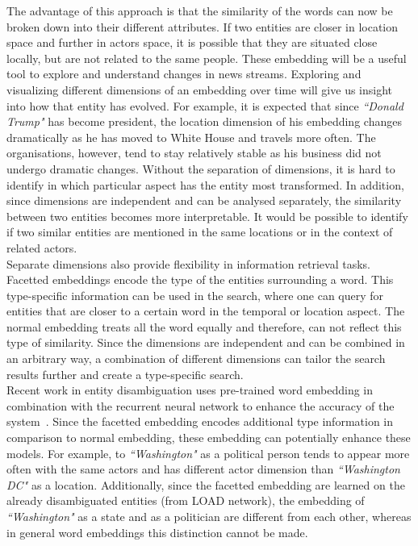 The advantage of this approach is that the similarity of the words can now be broken down into their different attributes. If two entities are closer in location space and further in actors space, it is possible that they are situated close locally, but are not related to the same people. These embedding will be a useful tool to explore and understand changes in news streams. Exploring and visualizing different dimensions of an embedding over time will give us insight into how that entity has evolved. For example, it is expected that since \emph{``Donald Trump"} has become president, the location dimension of his embedding changes dramatically as he has moved to White House and travels more often. The organisations, however, tend to stay relatively stable as his business did not undergo dramatic changes. Without the separation of dimensions, it is hard to identify in which particular aspect has the entity most transformed. In addition, since dimensions are independent and can be analysed separately, the similarity between two entities becomes more interpretable. It would be possible to identify if two similar entities are mentioned in the same locations or in the context of related actors. \\
Separate dimensions also provide flexibility in information retrieval tasks. Facetted embeddings encode the type of the entities surrounding a word. This type-specific information can be used in the search, where one can query for entities that are closer to a certain word in the temporal or location aspect. The normal embedding treats all the word equally and therefore, can not reflect this type of similarity. Since the dimensions are independent and can be combined in an arbitrary way, a combination of different dimensions can tailor the search results further and create a type-specific search. \\
Recent work in entity disambiguation uses pre-trained word embedding in combination with the recurrent neural network to enhance the accuracy of the system~. Since the facetted embedding encodes additional type information in comparison to normal embedding, these embedding can potentially enhance these models. For example, to \emph{``Washington"} as a political person tends to appear more often with the same actors and has different actor dimension than \emph{``Washington DC"} as a location. Additionally, since the facetted embedding are learned on the already disambiguated entities (from LOAD network), the embedding of \emph{``Washington"} as a state and as a politician are different from each other, whereas in general word embeddings this distinction cannot be made. \\
